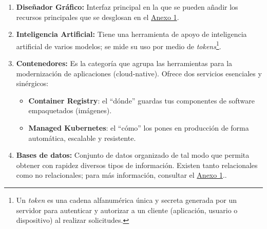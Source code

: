 \begin{enumerate}
    \item \textbf{Diseñador Gráfico: } Interfaz principal en la que se pueden añadir los recursos principales que se desglosan en el \hyperref[anexo:Lista-de-SKUs]{Anexo 1}.

    \item \textbf{Inteligencia Artificial: } Tiene una herramienta de apoyo de inteligencia artificial de varios modelos; se mide su uso por medio de \textit{tokens}\footnote{Un \textit{token} es una cadena alfanumérica única y secreta generada por un servidor para autenticar y autorizar a un cliente (aplicación, usuario o dispositivo) al realizar solicitudes.}.

    \item \textbf{Contenedores:} Es la categoría que agrupa las herramientas para la modernización de aplicaciones (cloud-native). Ofrece dos servicios esenciales y sinérgicos:
          \begin{itemize}
              \item \textbf{Container Registry}: el ``dónde'' guardas tus componentes de software empaquetados (imágenes).
              \item \textbf{Managed Kubernetes}: el ``cómo'' los pones en producción de forma automática, escalable y resistente.
          \end{itemize}

    \item \textbf{Bases de datos: } Conjunto de datos organizado de tal modo que permita obtener con rapidez diversos tipos de información. Existen tanto relacionales como no relacionales; para más información, consultar el \hyperref[anexo:Lista-de-SKUs]{Anexo 1}..


\end{enumerate}
